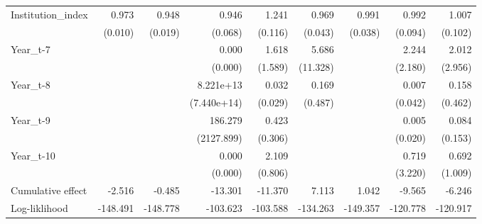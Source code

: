\begin{table}[htbp]
\begin{tabular}{l*{8}{D{.}{.}{-1}}}
Institution\_index&       0.973\sym{***}&       0.948\sym{***}&       0.946         &       1.241\sym{**} &       0.969         &       0.991         &       0.992         &       1.007         \\
            &     (0.010)         &     (0.019)         &     (0.068)         &     (0.116)         &     (0.043)         &     (0.038)         &     (0.094)         &     (0.102)         \\
Year\_t-7    &                     &                     &       0.000\sym{*}  &       1.618         &       5.686         &                     &       2.244         &       2.012         \\
            &                     &                     &     (0.000)         &     (1.589)         &    (11.328)         &                     &     (2.180)         &     (2.956)         \\
Year\_t-8    &                     &                     &   8.221e+13\sym{***}&       0.032\sym{***}&       0.169         &                     &       0.007         &       0.158         \\
            &                     &                     & (7.440e+14)         &     (0.029)         &     (0.487)         &                     &     (0.042)         &     (0.462)         \\
Year\_t-9    &                     &                     &     186.279         &       0.423         &                     &                     &       0.005         &       0.084         \\
            &                     &                     &  (2127.899)         &     (0.306)         &                     &                     &     (0.020)         &     (0.153)         \\
Year\_t-10   &                     &                     &       0.000         &       2.109\sym{*}  &                     &                     &       0.719         &       0.692         \\
            &                     &                     &     (0.000)         &     (0.806)         &                     &                     &     (3.220)         &     (1.009)         \\
\midrule
Cumulative effect&      -2.516         &      -0.485         &     -13.301         &     -11.370         &       7.113         &       1.042         &      -9.565         &      -6.246         \\
 Log-liklihood&    -148.491         &    -148.778         &    -103.623         &    -103.588         &    -134.263         &    -149.357         &    -120.778         &    -120.917         \\

\end{tabular}
\end{table}
